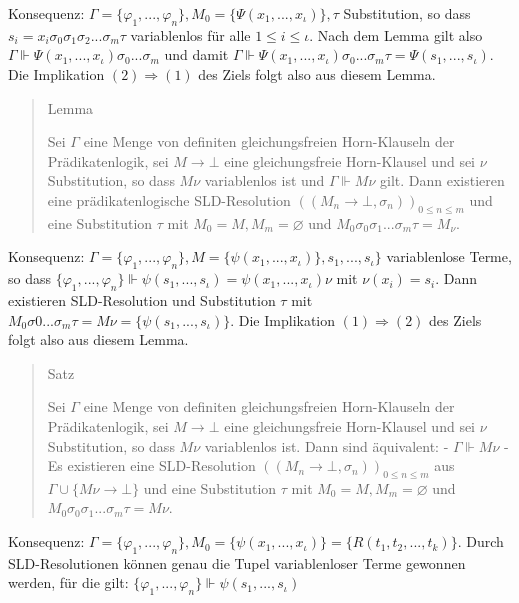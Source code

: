 \documentclass[a4paper]{article}
\begin{document}
\begin{multicols}{3}
  Konsequenz:
  $\Gamma=\{\varphi_1,...,\varphi_n\},M_0 =\{\Psi(x_1,...,x_{\iota})\},\tau$
  Substitution, so dass
  $s_i=x_i \sigma_0 \sigma_1 \sigma_2 ...\sigma_m \tau$ variablenlos für
  alle $1\leq i \leq \iota$. Nach dem Lemma gilt also
  $\Gamma \Vdash\Psi(x_1,...,x_{\iota})\sigma_0 ...\sigma_m$ und damit
  $\Gamma\Vdash\Psi(x_1 ,...,x_{\iota} )\sigma_0 ...\sigma_m\tau=\Psi(s_1,...,s_{\iota} )$.
  Die Implikation $(2)\Rightarrow (1)$ des Ziels folgt also aus diesem
  Lemma.

  \begin{quote}
    Lemma

    Sei $\Gamma$ eine Menge von definiten gleichungsfreien Horn-Klauseln der
    Prädikatenlogik, sei $M\rightarrow\bot$ eine gleichungsfreie
    Horn-Klausel und sei $\nu$ Substitution, so dass $M\nu$ variablenlos ist
    und $\Gamma\Vdash M\nu$ gilt. Dann existieren eine prädikatenlogische
    SLD-Resolution $((M_n \rightarrow\bot,\sigma_n))_{0 \leq n\leq m}$ und
    eine Substitution $\tau$ mit $M_0=M,M_m=\varnothing$ und
    $M_0 \sigma_0 \sigma_1... \sigma_m \tau=M_{\nu}$.
  \end{quote}

  Konsequenz:
  $\Gamma=\{\varphi_1,...,\varphi_n\},M=\{\psi(x_1 ,...,x_{\iota})\},s_1,...,s_\iota\}$
  variablenlose Terme, so dass
  $\{\varphi_1 ,...,\varphi_n\}\Vdash\psi(s_1,...,s_{\iota}) =\psi(x_1 ,...,x_{\iota})\nu$
  mit $\nu(x_i)=s_i$. Dann existieren SLD-Resolution und Substitution
  $\tau$ mit
  $M_0\sigma 0...\sigma_m\tau=M\nu=\{\psi (s_1,...,s_{\iota} )\}$. Die
  Implikation $(1)\Rightarrow (2)$ des Ziels folgt also aus diesem Lemma.

  \begin{quote}
    Satz

    Sei $\Gamma$ eine Menge von definiten gleichungsfreien Horn-Klauseln der
    Prädikatenlogik, sei $M\rightarrow\bot$ eine gleichungsfreie
    Horn-Klausel und sei $\nu$ Substitution, so dass $M\nu$ variablenlos
    ist. Dann sind äquivalent: - $\Gamma\Vdash M\nu$ - Es existieren eine
    SLD-Resolution $((M_n\rightarrow\bot,\sigma_n))_{0\leq n\leq m}$ aus
    $\Gamma\cup\{M\nu\rightarrow\bot\}$ und eine Substitution $\tau$ mit
    $M_0=M,M_m=\varnothing$ und $M_0\sigma_0\sigma_1...\sigma_m\tau=M\nu$.
  \end{quote}

  Konsequenz:
  $\Gamma =\{\varphi_1,...,\varphi_n\},M_0 =\{\psi(x_1,...,x_{\iota})\}=\{R(t_1,t_2,...,t_k)\}$.
  Durch SLD-Resolutionen können genau die Tupel variablenloser Terme
  gewonnen werden, für die gilt:
  $\{\varphi_1,...,\varphi_n\}\Vdash\psi (s_1,...,s_{\iota})$


\end{multicols}
\end{document}
